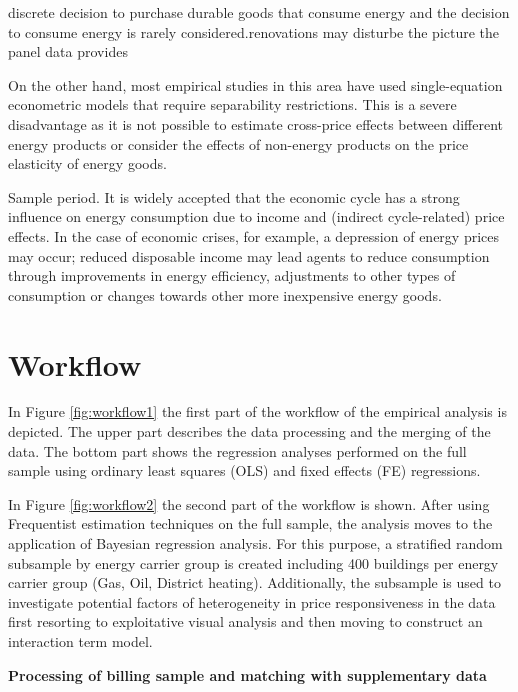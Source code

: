\documentclass[12pt,twoside]{reedthesis}
\begin{document}
discrete decision to purchase durable goods that consume energy and the decision to consume energy is rarely considered.renovations may disturbe the picture the panel data provides

On the other hand, most empirical studies in this area have used single-equation econometric models that require separability restrictions. This is a severe disadvantage as it is not possible to estimate cross-price effects between different energy products or consider the effects of non-energy products on the price elasticity of energy goods.

Sample period. It is widely accepted that the economic cycle has a strong influence on energy consumption due to income and (indirect cycle-related) price effects. In the case of economic crises, for example, a depression of energy prices may occur; reduced disposable income may lead agents to reduce consumption through improvements in energy efficiency, adjustments to other types of consumption or changes towards other more inexpensive energy goods.

\hypertarget{workflow}{%
\section{Workflow}\label{workflow}}

In Figure \ref{fig:workflow1} the first part of the workflow of the empirical analysis is depicted. The upper part describes the data processing and the merging of the data. The bottom part shows the regression analyses performed on the full sample using ordinary least squares (OLS) and fixed effects (FE) regressions.

In Figure \ref{fig:workflow2} the second part of the workflow is shown. After using Frequentist estimation techniques on the full sample, the analysis moves to the application of Bayesian regression analysis. For this purpose, a stratified random subsample by energy carrier group is created including 400 buildings per energy carrier group (Gas, Oil, District heating). Additionally, the subsample is used to investigate potential factors of heterogeneity in price responsiveness in the data first resorting to exploitative visual analysis and then moving to construct an interaction term model.

\textbf{Processing of billing sample and matching with supplementary data}
\end{document}
